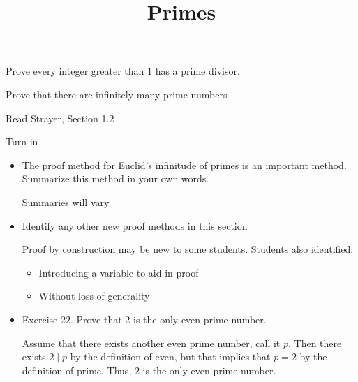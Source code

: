 \documentclass{ximera}
\title{Primes}
\begin{document}
\begin{abstract}
\end{abstract}
\maketitle


\begin{obj}
\item  Prove every integer greater than 1 has a prime divisor.
\item  Prove that there are infinitely many prime numbers
\end{obj}


\begin{pre}
 \item[Read] Strayer, Section 1.2
 \item[Turn in] 
\begin{itemize}
 \item The proof method for Euclid's infinitude of primes is an important method. Summarize this method in your own words.
 
\begin{solution}
 Summaries will vary
\end{solution}
 \item Identify any other new proof methods in this section
 
\begin{solution}
 Proof by construction may be new to some students. Students also identified: 
\begin{itemize}
 \item Introducing a variable to aid in proof
 \item Without loss of generality
 
\end{itemize}
\end{solution}
 \item Exercise 22. Prove that 2 is the only even prime number.
 
\begin{solution}
 Assume that there exists another even prime number, call it $p$. Then there exists $2\mid p$ by the definition of even, but that implies that $p=2$ by the definition of prime. Thus, $2$ is the only even prime number.
\end{solution}
\end{itemize}
\end{pre}
  
\end{document}
